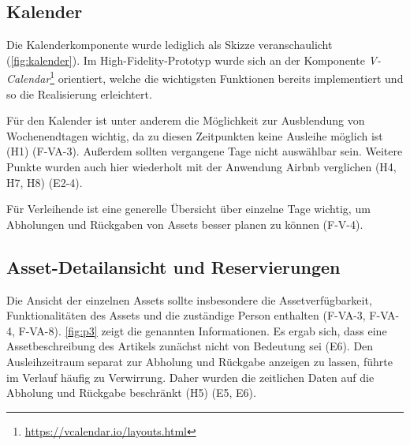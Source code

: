 \subsection{Kalender}
Die Kalenderkomponente wurde lediglich als Skizze veranschaulicht
(\ref{fig:kalender}). Im High-Fidelity-Prototyp wurde sich an der
Komponente
\textit{V-Calendar}\footnote{\url{https://vcalendar.io/layouts.html}}
orientiert, welche die wichtigsten Funktionen bereits implementiert und so die Realisierung
erleichtert.

Für den Kalender ist unter anderem die Möglichkeit zur Ausblendung von
Wochenendtagen wichtig, da zu diesen Zeitpunkten keine Ausleihe möglich ist (H1)
(F-VA-3). Außerdem sollten vergangene Tage nicht auswählbar sein. Weitere Punkte
wurden auch hier wiederholt mit der Anwendung Airbnb verglichen (H4, H7, H8) (E2-4).

Für Verleihende ist eine generelle Übersicht über einzelne Tage wichtig, um
Abholungen und Rückgaben von Assets besser planen zu können (F-V-4).

\subsection{Asset-Detailansicht und Reservierungen}
Die Ansicht der einzelnen Assets sollte insbesondere die Assetverfügbarkeit,
Funktionalitäten des Assets und die zuständige Person enthalten (F-VA-3, F-VA-4, F-VA-8).
\ref{fig:p3} zeigt die genannten Informationen. Es ergab sich, dass eine
Assetbeschreibung des Artikels zunächst nicht von Bedeutung sei (E6). Den
Ausleihzeitraum separat zur Abholung und Rückgabe anzeigen zu lassen, führte im
Verlauf häufig zu Verwirrung. Daher wurden die zeitlichen Daten auf die Abholung
und Rückgabe beschränkt (H5) (E5, E6).

